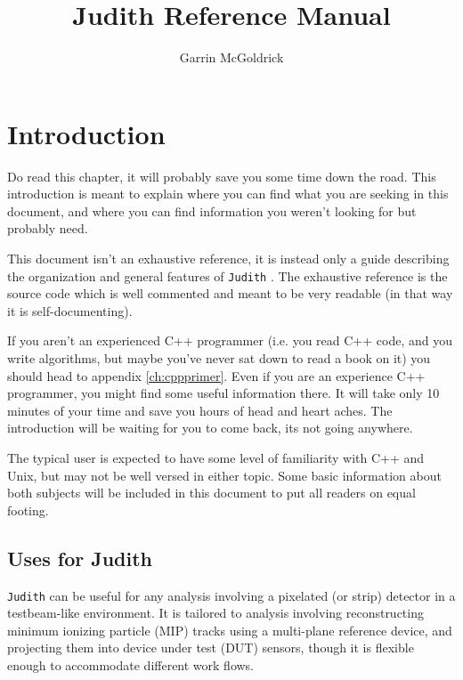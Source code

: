 \documentclass[10pt,a4paper]{book}
\author{Garrin McGoldrick}
\title{Judith Reference Manual}
\newcommand{\Judith}{\Verb`Judith` }
\begin{document}
\maketitle

\tableofcontents
\newpage


\chapter{Introduction}
\label{ch:introduction}

Do read this chapter, it will probably save you some time down the road. This introduction is meant to explain where you can find what you are seeking in this document, and where you can find information you weren't looking for but probably need.

This document isn't an exhaustive reference, it is instead only a guide describing the organization and general features of \Judith. The exhaustive reference is the source code which is well commented and meant to be very readable (in that way it is self-documenting).

If you aren't an experienced C++ programmer (i.e. you read C++ code, and you write algorithms, but maybe you've never sat down to read a book on it) you should head to appendix \ref{ch:cppprimer}. Even if you are an experience C++ programmer, you might find some useful information there. It will take only 10 minutes of your time and save you hours of head and heart aches. The introduction will be waiting for you to come back, its not going anywhere.

The typical user is expected to have some level of familiarity with C++ and Unix, but may not be well versed in either topic. Some basic information about both subjects will be included in this document to put all readers on equal footing.

\section{Uses for Judith}

\Judith can be useful for any analysis involving a pixelated (or strip) detector in a testbeam-like environment. It is tailored to analysis involving reconstructing minimum ionizing particle (MIP) tracks using a multi-plane reference device, and projecting them into device under test (DUT) sensors, though it is flexible enough to accommodate different work flows.
\end{document}

